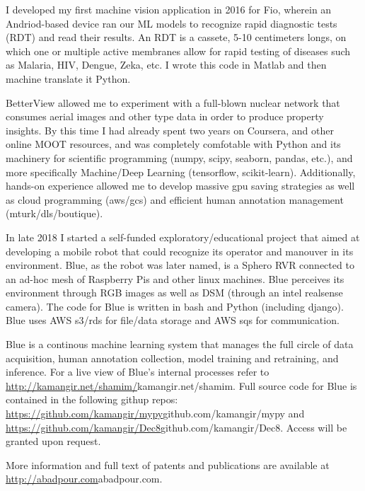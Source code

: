 I developed my first machine vision application in 2016 for Fio, wherein an Andriod-based device ran our ML models to recognize 
rapid diagnostic tests (RDT) and read their results. An RDT is a cassete, 5-10 centimeters longs, on which one or multiple active
membranes allow for rapid testing of diseases such as Malaria, HIV, Dengue, Zeka, etc. I wrote this code in Matlab and then machine 
translate it Python. 

BetterView allowed me to experiment with a full-blown nuclear network that consumes aerial images and other type data in order to 
produce property insights. By this time I had already spent two years on Coursera, and other online MOOT resources, and was completely 
comfotable with Python and its machinery for scientific programming (numpy, scipy, seaborn, pandas, etc.), and more specifically 
Machine/Deep Learning (tensorflow, scikit-learn). Additionally, hands-on experience allowed me to develop massive gpu saving strategies 
as well as cloud programming (aws/gcs) and efficient human annotation management (mturk/dls/boutique).

In late 2018 I started a self-funded exploratory/educational project that aimed at developing a mobile robot that could recognize its
operator and manouver in its environment. Blue, as the robot was later named, is a Sphero RVR connected to an ad-hoc mesh of Raspberry 
Pis and other linux machines. Blue perceives its environment through RGB images as well as DSM (through an intel realsense camera). The 
code for Blue is written in bash and Python (including django). Blue uses AWS s3/rds for file/data storage and AWS sqs for communication. 

Blue is a continous machine learning system that manages the full circle of data acquisition, human annotation collection, model training and
retraining, and inference. For a live view of Blue's internal processes refer to \url{http://kamangir.net/shamim/}{kamangir.net/shamim}. 
Full source code for Blue is contained in the following githup repos: \url{https://github.com/kamangir/mypy}{github.com/kamangir/mypy} 
and \url{https://github.com/kamangir/Dec8}{github.com/kamangir/Dec8}. Access will be granted upon 
request. 

\vspace{0.5cm}
More information and full text of patents and publications are available at \url{http://abadpour.com}{abadpour.com}.

\vspace{1.5cm}

